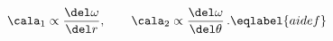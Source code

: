 \begin{equation}
\cala_1\propto \frac{\del\omega}{\del r},\qquad 
\cala_2\propto \frac{\del\omega}{\del \theta}\,.
\eqlabel{aidef}
\end{equation}

